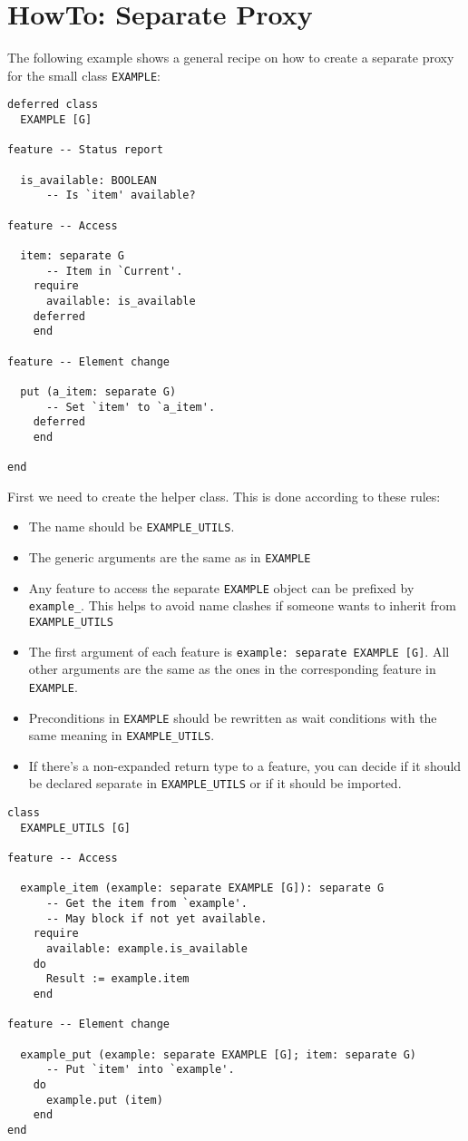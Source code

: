 \section{HowTo: Separate Proxy}



The following example shows a general recipe on how to create a separate proxy for the small class \lstinline!EXAMPLE!:

\begin{lstlisting}
deferred class
  EXAMPLE [G]

feature -- Status report

  is_available: BOOLEAN
      -- Is `item' available?
  
feature -- Access

  item: separate G
      -- Item in `Current'.
    require
      available: is_available
    deferred
    end

feature -- Element change

  put (a_item: separate G)
      -- Set `item' to `a_item'.
    deferred
    end

end
\end{lstlisting}

First we need to create the helper class.
This is done according to these rules:
 \begin{itemize}
  \item The name should be \lstinline!EXAMPLE_UTILS!.
  \item The generic arguments are the same as in \lstinline!EXAMPLE!
  \item Any feature to access the separate \lstinline!EXAMPLE! object can be prefixed by \lstinline!example_!.
  This helps to avoid name clashes if someone wants to inherit from \lstinline!EXAMPLE_UTILS!
  \item The first argument of each feature is \lstinline!example: separate EXAMPLE [G]!.
  All other arguments are the same as the ones in the corresponding feature in \lstinline!EXAMPLE!.
  \item Preconditions in \lstinline!EXAMPLE! should be rewritten as wait conditions with the same meaning in \lstinline!EXAMPLE_UTILS!.
  \item If there's a non-expanded return type to a feature, you can decide if it should be declared separate in \lstinline!EXAMPLE_UTILS! or if it should be imported.
 \end{itemize}

\begin{lstlisting}
class
  EXAMPLE_UTILS [G]
  
feature -- Access

  example_item (example: separate EXAMPLE [G]): separate G
      -- Get the item from `example'.
      -- May block if not yet available.
    require
      available: example.is_available
    do
      Result := example.item
    end

feature -- Element change
 
  example_put (example: separate EXAMPLE [G]; item: separate G)
      -- Put `item' into `example'.
    do
      example.put (item)
    end
end
\end{lstlisting}

